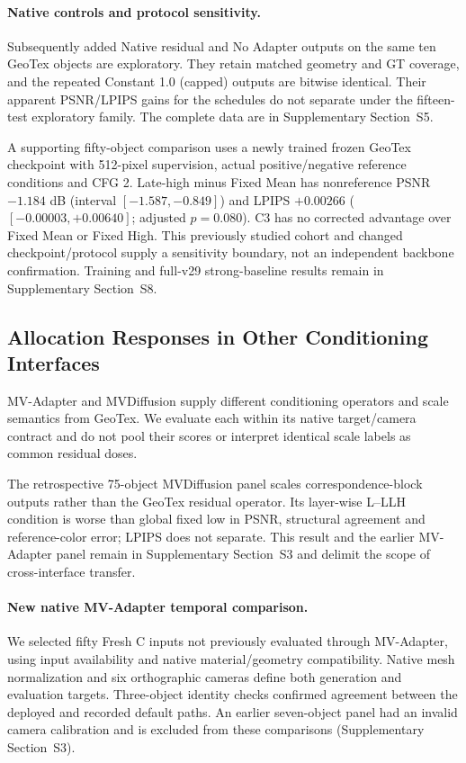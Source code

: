 \documentclass[times,twocolumn,final]{elsarticle}
\begin{document}
\paragraph{Native controls and protocol sensitivity.}
Subsequently added Native residual and No Adapter outputs on the same ten GeoTex objects are exploratory. They retain matched geometry and GT coverage, and the repeated Constant 1.0 (capped) outputs are bitwise identical. Their apparent PSNR/LPIPS gains for the schedules do not separate under the fifteen-test exploratory family. The complete data are in Supplementary Section~S5.

A supporting fifty-object comparison uses a newly trained frozen GeoTex checkpoint with 512-pixel supervision, actual positive/negative reference conditions and CFG 2. Late-high minus Fixed Mean has nonreference PSNR $-1.184$ dB (interval $[-1.587,-0.849]$) and LPIPS $+0.00266$ ($[-0.00003,+0.00640]$; adjusted $p=0.080$). C3 has no corrected advantage over Fixed Mean or Fixed High. This previously studied cohort and changed checkpoint/protocol supply a sensitivity boundary, not an independent backbone confirmation. Training and full-v29 strong-baseline results remain in Supplementary Section~S8.

\subsection{Allocation Responses in Other Conditioning Interfaces}
\label{subsec:cross-interface}
MV-Adapter and MVDiffusion supply different conditioning operators and scale semantics from GeoTex. We evaluate each within its native target/camera contract and do not pool their scores or interpret identical scale labels as common residual doses.

The retrospective 75-object MVDiffusion panel scales correspondence-block outputs rather than the GeoTex residual operator. Its layer-wise L--LLH condition is worse than global fixed low in PSNR, structural agreement and reference-color error; LPIPS does not separate. This result and the earlier MV-Adapter panel remain in Supplementary Section~S3 and delimit the scope of cross-interface transfer.

\paragraph{New native MV-Adapter temporal comparison.}
\label{subsec:new-mva}
We selected fifty Fresh C inputs not previously evaluated through MV-Adapter, using input availability and native material/geometry compatibility. Native mesh normalization and six orthographic cameras define both generation and evaluation targets. Three-object identity checks confirmed agreement between the deployed and recorded default paths. An earlier seven-object panel had an invalid camera calibration and is excluded from these comparisons (Supplementary Section~S3).
\end{document}
